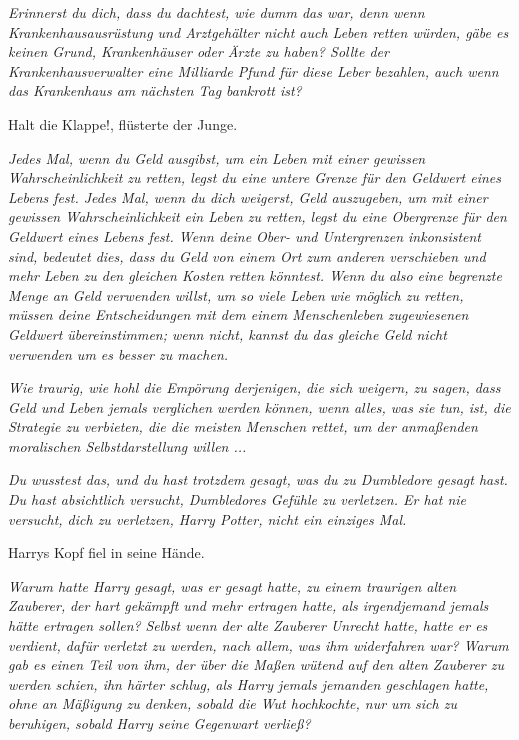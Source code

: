 \emph{Erinnerst du dich, dass du dachtest, wie dumm das war, denn wenn
Krankenhausausrüstung und Arztgehälter nicht auch Leben retten würden, gäbe es
keinen Grund, Krankenhäuser oder Ärzte zu haben? Sollte der Krankenhausverwalter
eine Milliarde Pfund für diese Leber bezahlen, auch wenn das Krankenhaus am
nächsten Tag bankrott ist?}

\glqq{}Halt die Klappe!\grqq{}, flüsterte der Junge.

\emph{Jedes Mal, wenn du Geld ausgibst, um ein Leben mit einer gewissen
Wahrscheinlichkeit zu retten, legst du eine untere Grenze für den Geldwert eines
Lebens fest. Jedes Mal, wenn du dich weigerst, Geld auszugeben, um mit einer
gewissen Wahrscheinlichkeit ein Leben zu retten, legst du eine Obergrenze für
den Geldwert eines Lebens fest. Wenn deine Ober- und Untergrenzen inkonsistent
sind, bedeutet dies, dass du Geld von einem Ort zum anderen verschieben und mehr
Leben zu den gleichen Kosten retten könntest. Wenn du also eine begrenzte Menge
an Geld verwenden willst, um so viele Leben wie möglich zu retten, müssen deine
Entscheidungen mit dem einem Menschenleben zugewiesenen Geldwert übereinstimmen;
wenn nicht, kannst du das gleiche Geld nicht verwenden um es besser zu machen.}

\emph{Wie traurig, wie hohl die Empörung derjenigen, die sich weigern, zu sagen,
dass Geld und Leben jemals verglichen werden können, wenn alles, was sie tun,
ist, die Strategie zu verbieten, die die meisten Menschen rettet, um der
anmaßenden moralischen Selbstdarstellung willen ...}

\emph{Du wusstest das, und du hast trotzdem gesagt, was du zu Dumbledore gesagt
hast. Du hast absichtlich versucht, Dumbledores Gefühle zu verletzen. Er hat nie
versucht, dich zu verletzen, Harry Potter, nicht ein einziges Mal.}

Harrys Kopf fiel in seine Hände.

\emph{Warum hatte Harry gesagt, was er gesagt hatte, zu einem traurigen alten
Zauberer,} \emph{der hart gekämpft und mehr ertragen hatte, als irgendjemand
jemals hätte ertragen sollen?} \emph{Selbst wenn der alte Zauberer Unrecht
hatte, hatte er es verdient, dafür verletzt zu werden, nach allem, was ihm
widerfahren war? Warum gab es einen Teil von ihm, der über die Maßen wütend auf
den alten Zauberer zu werden schien, ihn härter schlug, als Harry jemals
jemanden geschlagen hatte, ohne an Mäßigung zu denken, sobald die Wut
hochkochte, nur um sich zu beruhigen, sobald Harry seine Gegenwart verließ?}

